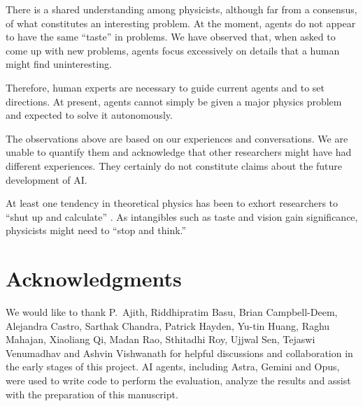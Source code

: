 \documentclass[aps,prd,reprint,superscriptaddress,nofootinbib]{revtex4-2}
\begin{document}
There is a shared understanding among physicists, although far from a consensus, of what constitutes an interesting problem. At the moment, agents do not appear to have the same ``taste'' in problems. We have observed that, when asked to come up with new problems, agents focus excessively on details that a human might find uninteresting. 

Therefore, human experts are necessary to guide current agents and  to set directions. At present, agents cannot simply be given a major physics problem and expected to solve it autonomously.

The observations above are based on our experiences and conversations. We are unable to quantify them and acknowledge that other researchers might have had different experiences. They certainly do not constitute claims about the future development of AI.

At least one tendency in theoretical physics has been to exhort researchers to ``shut up and calculate'' \cite{mermin1989pillow}. As intangibles such as taste and vision gain significance, physicists might need to ``stop and think.'' 

\section{Acknowledgments}
We would like to thank P.~Ajith, Riddhipratim Basu, Brian Campbell-Deem, Alejandra Castro, Sarthak Chandra, Patrick Hayden, Yu-tin Huang, Raghu Mahajan, Xiaoliang Qi, Madan Rao, Sthitadhi Roy,  Ujjwal Sen, Tejaswi Venumadhav and Ashvin Vishwanath for helpful discussions and collaboration in the early stages of this project.  AI agents, including Astra, Gemini and Opus, were used to write code to perform the evaluation, analyze the results and assist with the preparation of this manuscript.


\clearpage
\appendix
\onecolumngrid
\makeatletter
\let\set@footnotewidth\set@footnotewidth@one
\let\compose@footnotes\compose@footnotes@one
\onecolumn@grid@setup
\count{}\relax
\makeatother


\clearpage

\end{document}
